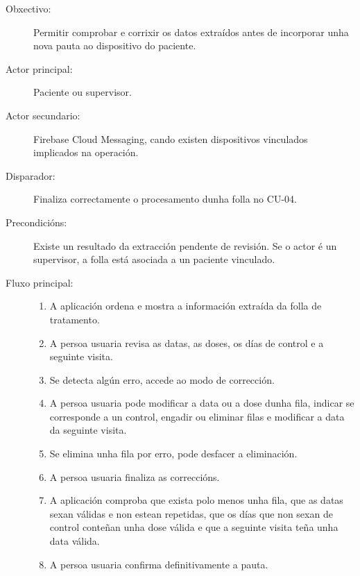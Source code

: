 \begin{description}

\item[Obxectivo:] Permitir comprobar e corrixir os datos extraídos antes de
incorporar unha nova pauta ao dispositivo do paciente.

\item[Actor principal:] Paciente ou supervisor.

\item[Actor secundario:] Firebase Cloud Messaging, cando existen dispositivos
vinculados implicados na operación.

\item[Disparador:] Finaliza correctamente o procesamento dunha folla no CU-04.

\item[Precondicións:] Existe un resultado da extracción pendente de revisión.
Se o actor é un supervisor, a folla está asociada a un paciente vinculado.

\item[Fluxo principal:] \hfill
\begin{enumerate}
    \item A aplicación ordena e mostra a información extraída da folla de
    tratamento.

    \item A persoa usuaria revisa as datas, as doses, os días de control e a
    seguinte visita.

    \item Se detecta algún erro, accede ao modo de corrección.

    \item A persoa usuaria pode modificar a data ou a dose dunha fila, indicar
    se corresponde a un control, engadir ou eliminar filas e modificar a data
    da seguinte visita.

    \item Se elimina unha fila por erro, pode desfacer a eliminación.

    \item A persoa usuaria finaliza as correccións.

    \item A aplicación comproba que exista polo menos unha fila, que as datas
    sexan válidas e non estean repetidas, que os días que non sexan de control
    conteñan unha dose válida e que a seguinte visita teña unha data válida.

    \item A persoa usuaria confirma definitivamente a pauta.


\end{enumerate}
\end{description}

